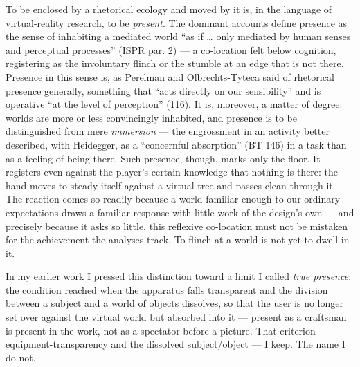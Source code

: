 \documentclass{article}
\begin{document}
To be enclosed by a rhetorical ecology and moved by it is, in the language of virtual-reality research, to be \textit{present}. The dominant accounts define presence as the sense of inhabiting a mediated world ``as if … only mediated by human senses and perceptual processes'' (ISPR par. 2) — a co-location felt below cognition, registering as the involuntary flinch or the stumble at an edge that is not there. Presence in this sense is, as Perelman and Olbrechts-Tyteca said of rhetorical presence generally, something that ``acts directly on our sensibility'' and is operative ``at the level of perception'' (116). It is, moreover, a matter of degree: worlds are more or less convincingly inhabited, and presence is to be distinguished from mere \textit{immersion} — the engrossment in an activity better described, with Heidegger, as a ``concernful absorption'' (BT 146) in a task than as a feeling of being-there. Such presence, though, marks only the floor. It registers even against the player's certain knowledge that nothing is there: the hand moves to steady itself against a virtual tree and passes clean through it. The reaction comes so readily because a world familiar enough to our ordinary expectations draws a familiar response with little work of the design's own — and precisely because it asks so little, this reflexive co-location must not be mistaken for the achievement the analyses track. To flinch at a world is not yet to dwell in it.

In my earlier work I pressed this distinction toward a limit I called \textit{true presence}: the condition reached when the apparatus falls transparent and the division between a subject and a world of objects dissolves, so that the user is no longer set over against the virtual world but absorbed into it — present as a craftsman is present in the work, not as a spectator before a picture. That criterion — equipment-transparency and the dissolved subject/object — I keep. The name I do not.
\end{document}
